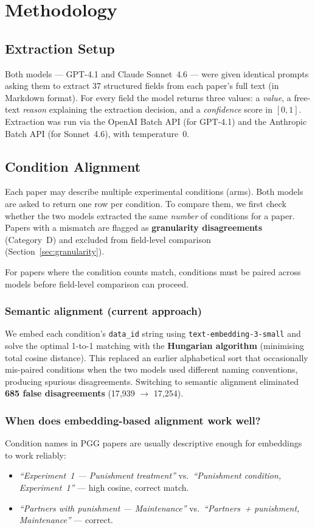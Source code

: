 \documentclass[11pt,a4paper]{article}
\begin{document}
\section{Methodology}

\subsection{Extraction Setup}
Both models --- GPT-4.1 and Claude Sonnet~4.6 --- were given identical prompts
asking them to extract 37 structured fields from each paper's full text
(in Markdown format).  For every field the model returns three values:
a \emph{value}, a free-text \emph{reason} explaining the extraction decision,
and a \emph{confidence} score in $[0,1]$.  Extraction was run via the OpenAI
Batch API (for GPT-4.1) and the Anthropic Batch API (for Sonnet~4.6),
with temperature~0.

\subsection{Condition Alignment}
Each paper may describe multiple experimental conditions (arms).  Both models
are asked to return one row per condition.  To compare them, we first check
whether the two models extracted the same \emph{number} of conditions for a
paper.  Papers with a mismatch are flagged as \textbf{granularity disagreements}
(Category~D) and excluded from field-level comparison (Section~\ref{sec:granularity}).

For papers where the condition counts match, conditions must be paired across
models before field-level comparison can proceed.

\subsubsection*{Semantic alignment (current approach)}
We embed each condition's \texttt{data\_id} string using
\texttt{text-embedding-3-small} and solve the optimal 1-to-1 matching with
the \textbf{Hungarian algorithm} (minimising total cosine distance).
This replaced an earlier alphabetical sort that occasionally mis-paired
conditions when the two models used different naming conventions, producing
spurious disagreements.  Switching to semantic alignment eliminated
\textbf{685 false disagreements} (17{,}939 $\rightarrow$ 17{,}254).

\subsubsection*{When does embedding-based alignment work well?}
Condition names in PGG papers are usually descriptive enough for embeddings
to work reliably:
\begin{itemize}
  \item \emph{``Experiment~1 --- Punishment treatment''} vs.\
    \emph{``Punishment condition, Experiment~1''} --- high cosine,
    correct match.
  \item \emph{``Partners with punishment --- Maintenance''} vs.\
    \emph{``Partners~+ punishment, Maintenance''} --- correct.
\end{itemize}
\end{document}
